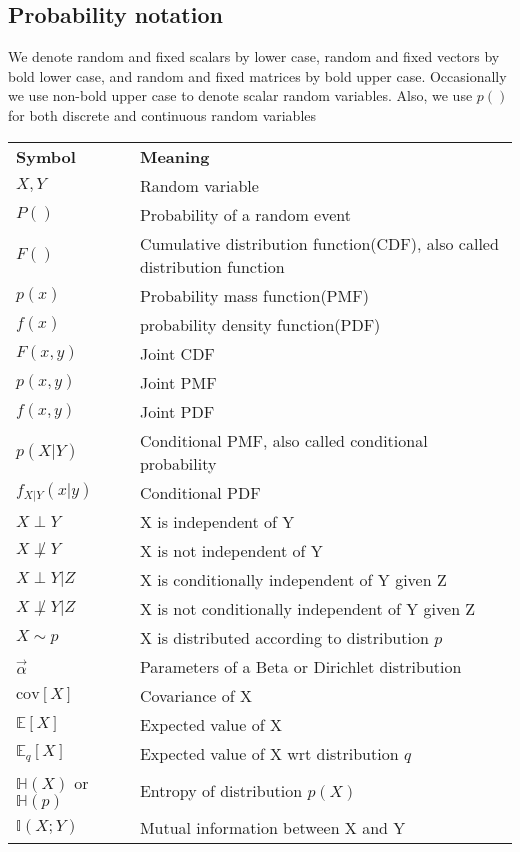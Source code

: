 {\begin{english}
\section*{Probability notation}
We denote random and fixed scalars by lower case, random and fixed vectors by bold lower case, and random and fixed matrices by bold upper case. Occasionally we use non-bold upper case to denote scalar random variables. Also, we use $p()$ for both discrete and continuous random variables

\begin{longtable}{ll}
\hline\noalign{\smallskip}
\textbf{Symbol} & \textbf{Meaning} \\
\noalign{\smallskip}\hline\noalign{\smallskip}
$X,Y$ & Random variable\\
$P()$ & Probability of a random event\\
$F()$ & Cumulative distribution function(CDF), also called distribution function\\
$p(x)$ & Probability mass function(PMF)\\
$f(x)$ & probability density function(PDF) \\
$F(x,y)$ & Joint CDF\\
$p(x,y)$ & Joint PMF \\
$f(x,y)$ & Joint PDF\\
$p(X|Y)$ & Conditional PMF, also called conditional probability\\
$f_{X|Y}(x|y)$ & Conditional PDF\\
$X \perp Y$ & X is independent of Y\\
$X \not\perp Y$ & X is not independent of Y\\
$X \perp Y | Z $ & X is conditionally independent of Y given Z\\
$X \not\perp Y | Z $ & X is not conditionally independent of Y given Z\\
$X \sim p$ & X is distributed according to distribution $p$\\
$\vec{\alpha}$ & Parameters of a Beta or Dirichlet distribution\\
$\mathrm{cov}[X]$ & Covariance of X\\
$\mathbb{E}[X]$ & Expected value of X\\
$\mathbb{E}_q[X]$ & Expected value of X wrt distribution $q$\\
$\mathbb{H}(X)$ or $\mathbb{H}(p)$ & Entropy of distribution $p(X)$\\
$\mathbb{I}(X;Y)$ & Mutual information between X and Y\\

\end{longtable}
\end{english}}
